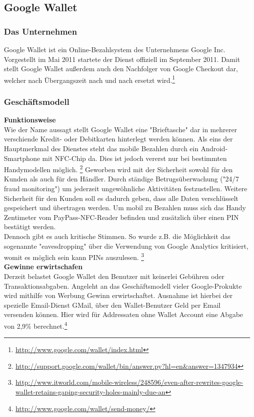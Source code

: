 \subsection{Google Wallet}
\subsubsection{Das Unternehmen}
Google Wallet ist ein Online-Bezahlsystem des Unternehmens Google Inc. Vorgestellt im Mai 2011 startete der Dienst offiziell im September 2011.
Damit stellt Google Wallet außerdem auch den Nachfolger von Google Checkout dar, welcher nach Übergangszeit nach und nach ersetzt wird.\footnote{\url{http://www.google.com/wallet/index.html}}

\subsubsection{ Geschäftsmodell}
\textbf{Funktionsweise}\\
Wie der Name aussagt stellt Google Wallet eine "Brieftasche" dar in mehrerer verschiende Kredit- oder Debitkarten hinterlegt werden können.
Als eins der Hauptmerkmal des Dienstes steht das mobile Bezahlen durch ein Android-Smartphone mit NFC-Chip da. Dies ist jedoch vererst nur bei bestimmten Handymodellen möglich. \footnote{\url{http://support.google.com/wallet/bin/answer.py?hl=en\&answer=1347934}}
Geworben wird mit der Sicherheit sowohl für den Kunden als auch für den Händler. Durch ständige Betrugsüberwachung ("24/7 fraud monitoring") um jederzeit ungewöhnliche Aktivitäten festzustellen. Weitere Sicherheit für den Kunden soll es dadurch geben, dass alle Daten verschlüsselt gespeichert und übertragen werden. Um mobil zu Bezahlen muss sich das Handy Zentimeter vom PayPass-NFC-Reader befinden und zusätzlich über einen PIN bestätigt werden.\\
Dennoch gibt es auch kritische Stimmen. So wurde z.B. die Möglichkeit das sogenannte "eavesdropping" über die Verwendung von Google Analytics kritisiert, womit es möglich sein kann PINs auszulesen.  \footnote{\url{http://www.itworld.com/mobile-wireless/248596/even-after-rewrites-google-wallet-retains-gaping-security-holes-mainly-due-an}}\\


\textbf{Gewinne erwirtschafen}\\
Derzeit belastet Google Wallet den Benutzer mit keinerlei Gebühren oder Transaktionsabgaben. Angeleht an das Geschäftsmodell vieler Google-Prokukte wird mithilfe von Werbung Gewinn erwirtschaftet.
Ausnahme ist hierbei der spezielle Email-Dienst GMail, über den Wallet-Benutzer Geld per Email versenden können. Hier wird für Addressaten ohne Wallet Account eine Abgabe von 2,9\% berechnet.\footnote{\url{http://www.google.com/wallet/send-money/}}\\

